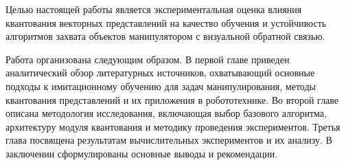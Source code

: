 Целью настоящей работы является экспериментальная оценка влияния квантования векторных представлений на качество обучения и устойчивость алгоритмов захвата объектов манипулятором с визуальной обратной связью.

Работа организована следующим образом. В первой главе приведен аналитический обзор литературных источников, охватывающий основные подходы к имитационному обучению для задач манипулирования, методы квантования представлений и их приложения в робототехнике. Во второй главе описана методология исследования, включающая выбор базового алгоритма, архитектуру модуля квантования и методику проведения экспериментов. Третья глава посвящена результатам вычислительных экспериментов и их анализу. В заключении сформулированы основные выводы и рекомендации.

\endinput
